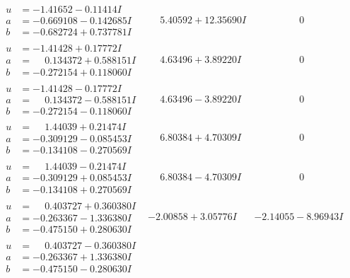 \documentclass[1p]{elsarticle_modified}
\theoremstyle{definition}
\begin{document}
$$\begin{array}{c|c|c}
 \hline 
\begin{aligned}
u &= -1.41652 - 0.11414 I \\
a &= -0.669108 - 0.142685 I \\
b &= -0.682724 + 0.737781 I\end{aligned}
 & \phantom{-}5.40592 + 12.35690 I & \phantom{-0.000000 } 0 \\ \hline\begin{aligned}
u &= -1.41428 + 0.17772 I \\
a &= \phantom{-}0.134372 + 0.588151 I \\
b &= -0.272154 + 0.118060 I\end{aligned}
 & \phantom{-}4.63496 + 3.89220 I & \phantom{-0.000000 } 0 \\ \hline\begin{aligned}
u &= -1.41428 - 0.17772 I \\
a &= \phantom{-}0.134372 - 0.588151 I \\
b &= -0.272154 - 0.118060 I\end{aligned}
 & \phantom{-}4.63496 - 3.89220 I & \phantom{-0.000000 } 0 \\ \hline\begin{aligned}
u &= \phantom{-}1.44039 + 0.21474 I \\
a &= -0.309129 - 0.085453 I \\
b &= -0.134108 - 0.270569 I\end{aligned}
 & \phantom{-}6.80384 + 4.70309 I & \phantom{-0.000000 } 0 \\ \hline\begin{aligned}
u &= \phantom{-}1.44039 - 0.21474 I \\
a &= -0.309129 + 0.085453 I \\
b &= -0.134108 + 0.270569 I\end{aligned}
 & \phantom{-}6.80384 - 4.70309 I & \phantom{-0.000000 } 0 \\ \hline\begin{aligned}
u &= \phantom{-}0.403727 + 0.360380 I \\
a &= -0.263367 - 1.336380 I \\
b &= -0.475150 + 0.280630 I\end{aligned}
 & -2.00858 + 3.05776 I & -2.14055 - 8.96943 I \\ \hline\begin{aligned}
u &= \phantom{-}0.403727 - 0.360380 I \\
a &= -0.263367 + 1.336380 I \\
b &= -0.475150 - 0.280630 I\end{aligned}

\end{array}$$
\end{document}
